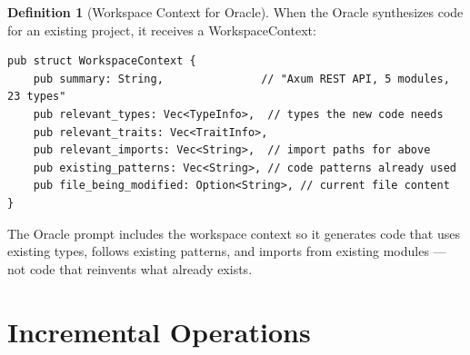 \documentclass[11pt,a4paper,twoside]{article}
\theoremstyle{definition}
\newtheorem{definition}{Definition}[section]
\theoremstyle{plain}
\theoremstyle{remark}
\begin{document}
\begin{definition}[Workspace Context for Oracle]\label{def:wscontext}
When the Oracle synthesizes code for an existing project, it receives
a WorkspaceContext:
\begin{lstlisting}
pub struct WorkspaceContext {
    pub summary: String,               // "Axum REST API, 5 modules, 23 types"
    pub relevant_types: Vec<TypeInfo>,  // types the new code needs
    pub relevant_traits: Vec<TraitInfo>,
    pub relevant_imports: Vec<String>,  // import paths for above
    pub existing_patterns: Vec<String>, // code patterns already used
    pub file_being_modified: Option<String>, // current file content
}
\end{lstlisting}
The Oracle prompt includes the workspace context so it generates code
that uses existing types, follows existing patterns, and imports from
existing modules --- not code that reinvents what already exists.
\end{definition}


\section{Incremental Operations}\label{sec:incremental}
\end{document}
